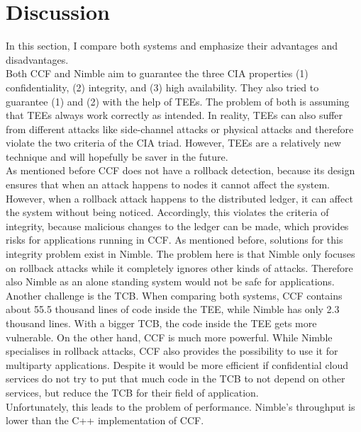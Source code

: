 \section{Discussion}
\label{challenges:ccf}
In this section, I compare both systems and emphasize their advantages and disadvantages.\\
Both CCF and Nimble aim to guarantee the three CIA properties (1) confidentiality, (2) integrity, and (3) high availability. They also tried to guarantee (1) and (2) with the help of TEEs. The problem of both is assuming that TEEs always work correctly as intended. In reality, TEEs can also suffer from different attacks like side-channel attacks or physical attacks and therefore violate the two criteria of the CIA triad. However, TEEs are a relatively new technique and will hopefully be saver in the future.\\
As mentioned before CCF does not have a rollback detection, because its design ensures that when an attack happens to nodes it cannot affect the system. However, when a rollback attack happens to the distributed ledger, it can affect the system without being noticed. Accordingly, this violates the criteria of integrity, because malicious changes to the ledger can be made, which provides risks for applications running in CCF.
As mentioned before, solutions for this integrity problem exist in Nimble. The problem here is that Nimble only focuses on rollback attacks while it completely ignores other kinds of attacks. Therefore also Nimble as an alone standing system would not be safe for applications.\\
Another challenge is the TCB. When comparing both systems, CCF contains about 55.5 thousand lines of code inside the TEE, while Nimble has only 2.3 thousand lines. With a bigger TCB, the code inside the TEE gets more vulnerable. On the other hand, CCF is much more powerful. While Nimble specialises in rollback attacks, CCF also provides the possibility to use it for multiparty applications.  Despite it would be more efficient if confidential cloud services do not try to put that much code in the TCB to not depend on other services, but reduce the TCB for their field of application.\\
 Unfortunately, this leads to the problem of performance. Nimble's throughput is lower than the C++ implementation of CCF. \\
  

